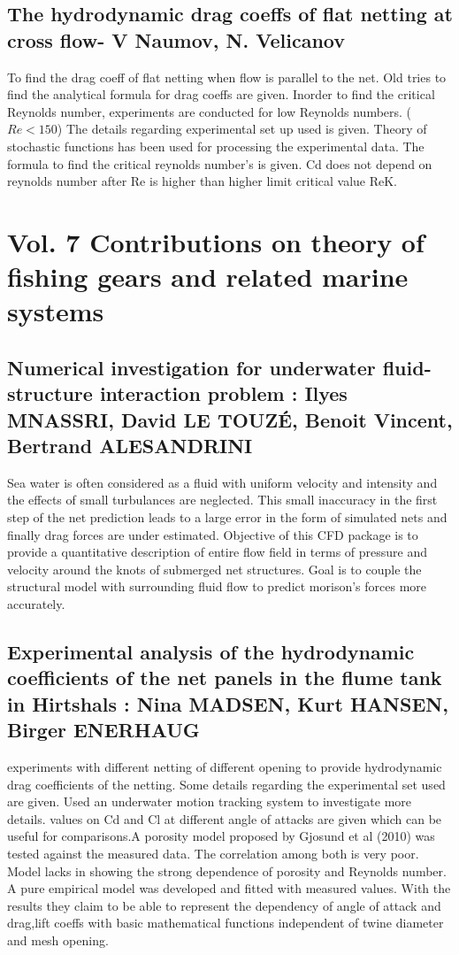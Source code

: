 \documentclass[letterpaper,12pt]{article}
\begin{document}
\subsection{The hydrodynamic drag coeffs of flat netting at cross flow- V Naumov, N. Velicanov}
To find the drag coeff of flat netting when flow is parallel to the net. Old tries to find the analytical formula for drag coeffs are given. Inorder to find the critical Reynolds number, experiments are conducted for low Reynolds numbers. ($Re < 150$) The details regarding experimental set up used is given.
Theory of stochastic functions has been used for processing the experimental data. The formula to find the critical reynolds number's is given. Cd does not depend on reynolds number after Re is higher than higher limit critical value ReK. 
\section{Vol. 7 Contributions on theory of fishing gears and related marine systems}
\subsection{Numerical investigation for underwater fluid-structure interaction problem : Ilyes MNASSRI, David LE TOUZÉ, Benoit Vincent, Bertrand ALESANDRINI}
Sea water is often considered as a fluid with uniform velocity and intensity and the effects of small turbulances are neglected. This small inaccuracy in the first step of the net prediction leads to a large error in the form of simulated nets and finally drag forces are under estimated. Objective of this CFD package is to provide a quantitative description of entire flow field in terms of pressure and velocity around the knots of submerged net structures. Goal is to couple the structural model with surrounding fluid flow to predict morison's forces more accurately.

\subsection{Experimental analysis of the hydrodynamic coefficients of the net panels in the flume tank in Hirtshals : Nina MADSEN, Kurt HANSEN, Birger ENERHAUG}
experiments with different netting of different opening to provide hydrodynamic drag coefficients of the netting. Some details regarding the experimental set used are given. Used an underwater motion tracking system to investigate more details. values on Cd and Cl at different angle of attacks are given which can be useful for comparisons.A porosity model proposed by Gjosund et al (2010) was tested against the measured data. The correlation among both is very poor. Model lacks in showing the strong dependence of porosity and Reynolds number.
A pure empirical model was developed and fitted with measured values. With the results they claim to be able to represent the dependency of angle of attack and drag,lift coeffs with basic mathematical functions independent of twine diameter and mesh opening.
\end{document}
